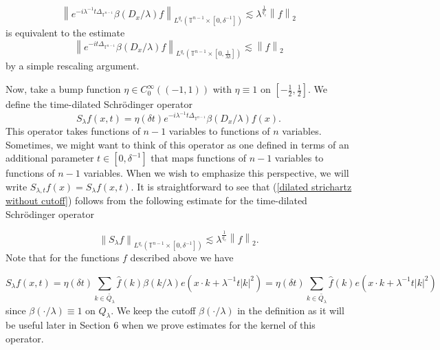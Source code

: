 \documentclass[11pt]{amsart}
\numberwithin{equation}{section}
\newcommand{\Tn}{\mathbb{T}^{n-1}}
\newcommand{\la}{\lambda}
\newcommand\norm[1]{\left\lVert#1\right\rVert}
\newcommand{\lpnorm}[3]{\norm{#1}_{L^{#2}(#3)}}
\newcommand{\altlpnorm}[2]{\norm{#1}_{#2}}
\newcommand{\laplac}[1]{\Delta_{#1}}
\newcommand{\Sl}{S_{\la}}
\begin{document}
\begin{equation} \label{dilated strichartz without cutoff}
    \lpnorm{e^{-i\la^{-1}t\laplac{\Tn}}\beta(D_x / \la) f}{q_c}{\Tn \times [0, \delta^{-1}]} \lesssim \la^{\frac{1}{q_c}}\altlpnorm{f}{2}
\end{equation}
is equivalent to the estimate
\begin{equation}
    \lpnorm{e^{-it\laplac{\Tn}}\beta(D_x / \la) f}{q_c}{\Tn \times [0, \frac{1}{\la \delta}]} \lesssim \altlpnorm{f}{2}
\end{equation}
by a simple rescaling argument.

Now, take a bump function $\eta \in C^{\infty}_{0}((-1,1))$ with $\eta \equiv 1$ on $[-\frac{1}{2}, \frac{1}{2}]$. We define the time-dilated Schr\"{o}dinger operator
\begin{equation} \label{time-dilated schordinger operator}
    \Sl f(x,t) = \eta(\delta t)e^{-i\la^{-1}t\laplac{\Tn}}\beta(D_x / \la)f(x).
\end{equation}
This operator takes functions of $n-1$ variables to functions of $n$ variables. Sometimes, we might want to think of this operator as one defined in terms of an additional parameter $t \in [0,\delta^{-1}]$ that maps functions of $n-1$ variables to functions of $n-1$ variables. When we wish to emphasize this perspective, we will write $S_{\la ,t}f(x) = \Sl f(x,t)$. It is straightforward to see that (\ref{dilated strichartz without cutoff}) follows from the following estimate for the time-dilated Schr\"{o}dinger operator

\begin{equation} \label{dilated strichartz with cutoff}
    \lpnorm{\Sl f}{q_c}{\Tn \times [0, \delta^{-1}]} \lesssim \la^{\frac{1}{q_c}}\altlpnorm{f}{2}.
\end{equation}
Note that for the functions $f$ described above we have

\begin{equation}
    \Sl f(x,t) = \eta(\delta t)\sum_{k \in \tilde{Q_{\la}}}\widehat{f}(k)\beta(k / \la)e(x \cdot k + \la^{-1}t|k|^2) = \eta(\delta t)\sum_{k \in \tilde{Q_{\la}}}\widehat{f}(k)e(x \cdot k + \la^{-1}t|k|^2)
\end{equation}
since $\beta(\cdot / \la) \equiv 1$ on $Q_{\la}$. We keep the cutoff $\beta(\cdot / \la)$ in the definition as it will be useful later in Section 6 when we prove estimates for the kernel of this operator.
\end{document}
